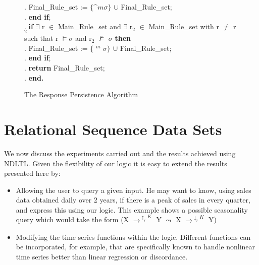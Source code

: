 {\begin{figure}[ht]
\begin{center}
{\begin{minipage}{16cm}
\begin{algorithm}
\begin{rm}
\begin{tabbing}
\sa.  \> \> \> \> Final\_Rule\_set := $\{ \bm^m \sigma  \}$ $\cup$ Final\_Rule\_set; \\
\sa.  \> \> \> {\bf end if};\\
\sa.  \> \> \> {\bf if } $\exists$ r $\in$ Main\_Rule\_set and $\exists$ r$_2$
$\in$ Main\_Rule\_set with r $\not=$ r$_2$ \\ 
\> \> \> \> \> such that r $\models \sigma$ and r$_2$
 $\not\models$ $\sigma$ {\bf then} \\
\sa.  \> \> \> \> Final\_Rule\_set := $\{$ \diam$^m$ $\sigma \}$ $\cup$ Final\_Rule\_set;\\
\sa.  \> \> \> {\bf end if};\\

\sa.  \> \> \> {\bf return} Final\_Rule\_set; \\
\sa. \> \> {\bf end.}
\end{tabbing}
\end{rm}
\end{algorithm}
\end{minipage}}
\caption{\label{tr:fig:resp} The Response Persistence Algorithm}
\end{center}
\end{figure}
}




\section{Relational Sequence Data Sets}\label{sec:tr_relseq}


We now discuss the experiments carried out and the results achieved
using NDLTL. Given the flexibility of our logic it is easy to extend
the results presented here by: 
\begin{itemize}
\item Allowing the user to query a given input. He may want to know,
using sales data obtained daily over 2 years, if there is a peak of sales in every quarter, and
express this using our logic. This example shows a possible
seasonality query which would take the form \linebreak[4]  (X
$\to^{\uparrow_r K}$ Y $\leadsto$ X $\to^{\downarrow_r K}$ Y)
\item Modifying the time series functions within the logic. Different
functions can be incorporated, for example, that are specifically
known to handle nonlinear time series better than linear regression or
discordance.
\end{itemize}

